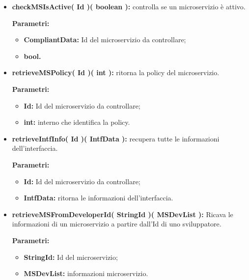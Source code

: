 \begin{itemize}
\begin{itemize}
			\item \textbf{checkMSIsActive( Id )( boolean ):} controlla se un microservizio è attivo. 
				\begin{description}
					\item[\textbf{Parametri:}]
				\end{description}
				\begin{itemize}
					\item \textbf{CompliantData:} Id del microservizio da controllare;
					\item \textbf{bool.}
				\end{itemize}
		
			\item \textbf{retrieveMSPolicy( Id )( int ):} ritorna la policy del microservizio. 
			\begin{description}
				\item[\textbf{Parametri:}]
			\end{description}
			\begin{itemize}
				\item \textbf{Id:} Id del microservizio da controllare;
				\item \textbf{int:} interno che identifica la policy.
			\end{itemize}

			\item \textbf{retrieveIntfInfo( Id )( IntfData ):} recupera tutte le informazioni dell'interfaccia. 
			\begin{description}
				\item[\textbf{Parametri:}]
			\end{description}
			\begin{itemize}
				\item \textbf{Id:} Id del microservizio da controllare;
				\item \textbf{IntfData:} ritorna le informazioni dell'interfaccia.
			\end{itemize}
				
			\item \textbf{retrieveMSFromDeveloperId( StringId )( MSDevList ):} Ricava le informazioni di un microservizio a partire dall'Id di uno sviluppatore.
				\begin{description}
    				\item[\textbf{Parametri:}]
				\end{description}
				\begin{itemize}
					\item \textbf{StringId:} Id del microservizio;
					\item \textbf{MSDevList:} informazioni microservizio.
				\end{itemize}
				

\end{itemize}
\end{itemize}
